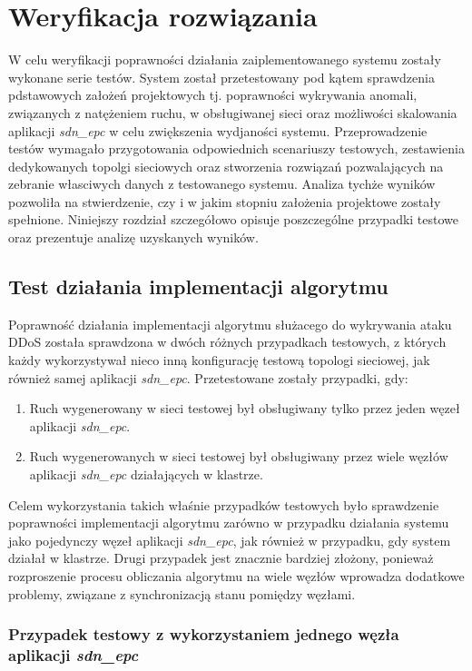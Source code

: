 \chapter{Weryfikacja rozwiązania}

W celu weryfikacji poprawności działania zaiplementowanego systemu zostały
wykonane serie testów. System został przetestowany pod kątem sprawdzenia
pdstawowych założeń projektowych tj. poprawności wykrywania anomali, związanych
z natężeniem ruchu, w obsługiwanej sieci oraz możliwości skalowania
aplikacji \textit{sdn\_epc} w celu zwiększenia wydjaności systemu.
Przeprowadzenie testów wymagało przygotowania odpowiednich scenariuszy testowych,
zestawienia dedykowanych topolgi sieciowych oraz stworzenia rozwiązań
pozwalających na zebranie własciwych danych z testowanego systemu. Analiza
tychże wyników pozwoliła na stwierdzenie, czy i w jakim stopniu założenia
projektowe zostały spełnione. Niniejszy rozdział szczegółowo opisuje
poszczególne przypadki testowe oraz prezentuje analizę uzyskanych wyników.

\section{Test działania implementacji algorytmu}
 
Poprawność działania implementacji algorytmu służacego do wykrywania ataku
DDoS została sprawdzona w dwóch różnych przypadkach testowych, z których każdy
wykorzystywał nieco inną konfigurację testową topologi sieciowej, jak również
samej aplikacji \textit{sdn\_epc}. Przetestowane zostały przypadki, gdy:
\begin{enumerate}
  \item Ruch wygenerowany w sieci testowej był obsługiwany tylko przez jeden
    węzeł aplikacji \textit{sdn\_epc}.
  \item Ruch wygenerowanych w sieci testowej był obsługiwany przez wiele węzłów
    aplikacji \textit{sdn\_epc} działających w klastrze.
\end{enumerate}
Celem wykorzystania takich właśnie przypadków testowych było sprawdzenie
poprawności implementacji algorytmu zarówno w przypadku działania systemu jako
pojedynczy węzeł aplikacji \textit{sdn\_epc}, jak również w przypadku, gdy
system działał w klastrze. Drugi przypadek jest znacznie bardziej złożony,
ponieważ rozproszenie procesu obliczania algorytmu na wiele węzłów wprowadza
dodatkowe problemy, związane z synchronizacją stanu pomiędzy węzłami.

\subsection{Przypadek testowy z wykorzystaniem jednego węzła aplikacji
  \textit{sdn\_epc}}